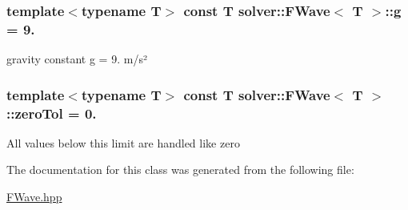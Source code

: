\subsubsection[{g}]{\setlength{\rightskip}{0pt plus 5cm}template$<$typename T$>$ const T {\bf solver\+::\+F\+Wave}$<$ T $>$\+::g = 9.\hspace{0.3cm}{\ttfamily [static]}}\label{classsolver_1_1FWave_ac3884c16c1822530961884e9f52304a2}
gravity constant g = 9. m/s² \hypertarget{classsolver_1_1FWave_aa7adb43b1b39a0f78d0784e05f7b040e}{}
\subsubsection[{zero\+Tol}]{\setlength{\rightskip}{0pt plus 5cm}template$<$typename T$>$ const T {\bf solver\+::\+F\+Wave}$<$ T $>$\+::zero\+Tol = 0.\hspace{0.3cm}{\ttfamily [static]}}\label{classsolver_1_1FWave_aa7adb43b1b39a0f78d0784e05f7b040e}
All values below this limit are handled like zero 

The documentation for this class was generated from the following file\+:\begin{DoxyCompactItemize}
\item 
\hyperlink{FWave_8hpp}{F\+Wave.\+hpp}\end{DoxyCompactItemize}
